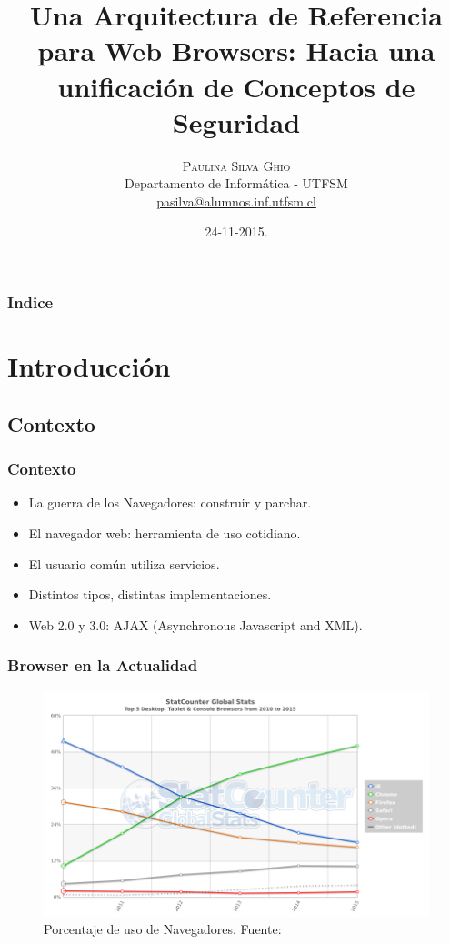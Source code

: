 \documentclass[serif,9pt]{beamer}
\begin{document}
\title{Una Arquitectura de Referencia para Web Browsers: Hacia una unificaci\'on de Conceptos de Seguridad} 
\author[Paulina Silva Ghio]{\textsc{Paulina Silva Ghio} \\ \medskip
\small{}
Departamento de Inform\'atica - UTFSM\\ \medskip
\url{pasilva@alumnos.inf.utfsm.cl}}
\institute[]{}
\date{24-11-2015.}

\begin{frame}[plain]
\titlepage
\end{frame}


\begin{frame}
\frametitle{Indice}
\tableofcontents
\end{frame} 


\section{Introducci\'on}
\subsection{Contexto}
\begin{frame}
\frametitle{Contexto}

	\begin{itemize}
		\item<1-> La guerra de los Navegadores: construir y parchar.
		\item<2-> El navegador web: herramienta de uso cotidiano.
		\item<3-> El usuario com\'un utiliza servicios.
		\item<4-> Distintos tipos, distintas implementaciones.
		\item<5-> Web 2.0 y 3.0: AJAX (Asynchronous Javascript and XML).
	\end{itemize}
\end{frame}


\begin{frame}
\frametitle{Browser en la Actualidad}
	\begin{figure}[h]
	    \centering
	    \includegraphics[width=1\textwidth]{figures/StatCounter-browser-ww-yearly-2010-2015.png}
	    \caption{Porcentaje de uso de Navegadores. Fuente: \cite{statBrow}}
	    \label{fig:UsageShare}
	\end{figure}
\end{frame}
\end{document}
